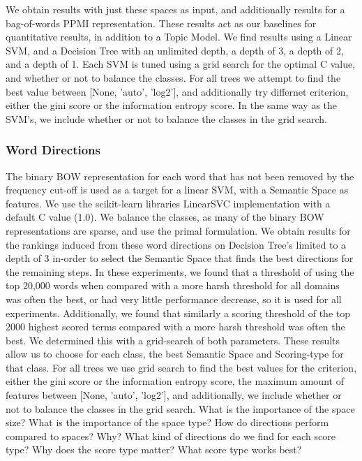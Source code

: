 We obtain results with just these spaces as input, and additionally results for a bag-of-words PPMI representation. These results act as our baselines for quantitative results, in addition to a Topic Model. We find results using a Linear SVM, and a Decision Tree with an unlimited depth, a depth of 3, a depth of 2, and a depth of 1. Each SVM is tuned using a grid search for the optimal C value, and whether or not to balance the classes. For all trees we attempt to find the best value between [None, 'auto', 'log2'], and additionally try differnet criterion, either the gini score or the information entropy score. In the same way as the SVM's, we include whether or not to balance the classes in the grid search.

\subsubsection{Word Directions}
The binary BOW representation for each word that has not been removed by the frequency cut-off is used as a target for a linear SVM, with a Semantic Space as features. We use the scikit-learn libraries LinearSVC implementation with a default C value (1.0). We balance the classes, as many of the binary BOW representations are sparse, and use the primal formulation. %
We obtain results for the rankings induced from these word directions on Decision Tree's limited to a depth of 3 in-order to select the Semantic Space that finds the best directions for the remaining steps. In these experiments, we found that a threshold of using the top 20,000 words when compared with a more harsh threshold for all domains was often the best, or had very little performance decrease, so it is used for all experiments. Additionally, we found that similarly a scoring threshold of the top 2000 highest scored terms compared with a more harsh threshold was often the best. We determined this with a grid-search of both parameters. 
These results allow us to choose for each class, the best Semantic Space and Scoring-type for that class. For all trees we use grid search to find the best values for the criterion, either the gini score or the information entropy score, the maximum amount of features between [None, 'auto', 'log2'], and additionally, we include whether or not to balance the classes in the grid search.
What is the importance of the space size?
What is the importance of the space type?
How do directions perform compared to spaces? Why?
What kind of directions do we find for each score type?
Why does the score type matter? What score type works best?


